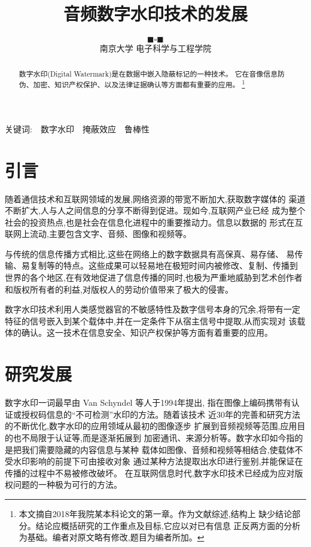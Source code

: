 \documentclass[a4paper]{article}
\title{音频数字水印技术的发展}
\author{$\blacksquare \square \blacksquare$\\[2ex]
 南京大学 电子科学与工程学院}
\begin{document}
\maketitle

\begin{abstract}
数字水印(Digital Watermark)是在数据中嵌入隐蔽标记的一种技术。
它在音像信息防伪、加密、知识产权保护、以及法律证据确认等方面都有重要的应用。
\footnote{本文摘自2018年我院某本科论文的第一章。作为文献综述,结构上
    缺少结论部分。结论应概括研究的工作重点及目标,它应以对已有信息
    正反两方面的分析为基础。编者对原文略有修改,题目为编者所加。}

\end{abstract}

关键词:~~数字水印~~掩蔽效应~~鲁棒性
\section{引言}
随着通信技术和互联网领域的发展,网络资源的带宽不断加大,获取数字媒体的
渠道不断扩大,人与人之间信息的分享不断得到促进。现如今,互联网产业已经
成为整个社会的投资热点,也是社会在信息化进程中的重要推动力。信息以数据的
形式在互联网上流动,主要包含文字、音频、图像和视频等。

\marginpar{\color{red}{分析面过窄}}
与传统的信息传播方式相比,这些在网络上的数字数据具有高保真、易存储、
易传输、易复制等的特点。这些成果可以轻易地在极短时间内被修改、复制、传播到
世界的各个地区,在有效地促进了信息传播的同时,也极为严重地威胁到艺术创作者
和版权所有者的利益,对版权人的劳动价值带来了极大的侵害。

数字水印技术利用人类感觉器官的不敏感特性及数字信号本身的冗余,将带有一定
特征的信号嵌入到某个载体中,并在一定条件下从宿主信号中提取,从而实现对
该载体的确认。这一技术在信息安全、知识产权保护等方面有着重要的应用。

\section{研究发展}
\marginpar{\color{red}{Chronological}}
数字水印一词最早由 Van Schyndel 等人\cite{schyndel1994}于1994年提出,
指在图像上编码携带有认证或授权码信息的“不可检测”水印的方法。随着该技术
近30年的完善和研究方法的不断优化,数字水印的应用领域从最初的图像逐步
扩展到音频视频等范围,应用目的也不局限于认证等,而是逐渐拓展到
加密通讯、来源分析等。数字水印如今指的是把我们需要隐藏的内容信息与某种
载体如图像、音频和视频等相结合,使载体不受水印影响的前提下可由接收对象
通过某种方法提取出水印进行鉴别,并能保证在传播的过程中不易被修改破坏。
在互联网信息时代,数字水印技术已经成为应对版权问题的一种极为可行的方法。
\end{document}
